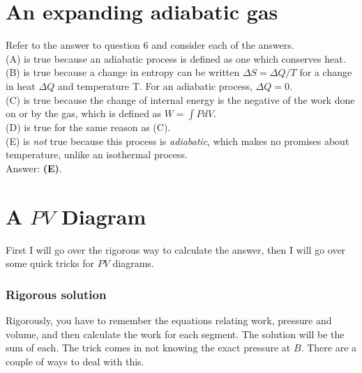 \documentclass[11pt]{paper}
\newcommand{\answer}[1]{Answer: \textbf{(#1)}.}
\begin{document}
\section{An expanding adiabatic gas}
Refer to the answer to question 6 and consider each of the answers.\\
(A) is true because an adiabatic process is defined as one which conserves heat.\\
(B) is true because a change in entropy can be written $\Delta S = \Delta Q/T$ for a change in heat $\Delta Q$ and temperature T.  For an adiabatic process, $\Delta Q = 0$.\\
(C) is true because the change of internal energy is the negative of the work done on or by the gas, which is defined as $W = \int P dV$.\\
(D) is true for the same reason as (C).\\
(E) is \emph{not} true because this process is \emph{adiabatic}, which makes no promises about temperature, unlike an isothermal process.\\

\answer{E}

\section{A $PV$ Diagram}
First I will go over the rigorous way to calculate the answer, then I will go over some quick tricks for $PV$ diagrams.

\subsubsection*{Rigorous solution}
Rigorously, you have to remember the equations relating work, pressure and volume, and then calculate the work for each segment.  The solution will be the sum of each.  The trick comes in not knowing the exact pressure at $B$.  There are a couple of ways to deal with this.
\end{document}
